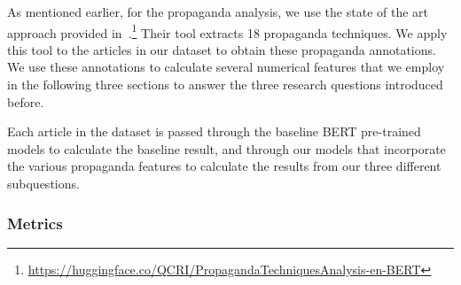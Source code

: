 As mentioned earlier, for the propaganda analysis, we use the state of the art approach provided in~\citet{da2019fine}.\footnote{\url{https://huggingface.co/QCRI/PropagandaTechniquesAnalysis-en-BERT}} Their tool extracts 18 propaganda techniques. We apply this tool to the articles in our dataset to obtain these propaganda annotations.
We use these annotations to calculate several numerical features that we employ in the following three sections to answer the three research questions introduced before.



Each article in the dataset is passed through the baseline BERT pre-trained models to calculate the baseline result, and through our models that incorporate the various propaganda features to calculate the results from our three different subquestions. %

\subsubsection{Metrics}


